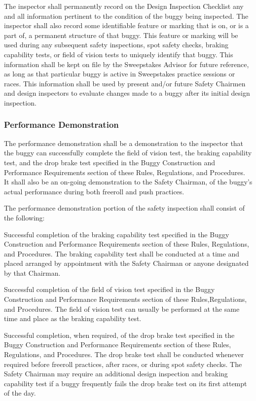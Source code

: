 \documentclass[openany]{book}
\begin{document}
The inspector shall permanently record on the Design Inspection Checklist any and all information pertinent to the condition of the buggy being inspected. The inspector shall also record some identifiable feature or marking that is on, or is a part of, a permanent structure of that buggy. This feature or marking will be used during any subsequent safety inspections, spot safety checks, braking capability tests, or field of vision tests to uniquely identify that buggy. This information shall be kept on file by the Sweepstakes Advisor for future reference, as long as that particular buggy is active in Sweepstakes practice sessions or races. This information shall be used by present and/or future Safety Chairmen and design inspectors to evaluate changes made to a buggy after its initial design inspection.

\subsubsection{Performance Demonstration}
The performance demonstration shall be a demonstration to the inspector that the buggy can successfully complete the field of vision test, the braking capability test, and the drop brake test specified in the Buggy Construction and Performance Requirements section of these Rules, Regulations, and Procedures. It shall also be an on-going demonstration to the Safety Chairman, of the buggy's actual performance during both freeroll and push practices.

The performance demonstration portion of the safety inspection shall consist of the following:

Successful completion of the braking capability test specified in the Buggy Construction and Performance Requirements section of these Rules, Regulations, and Procedures. The braking capability test shall be conducted at a time and placed arranged by appointment with the Safety Chairman or anyone designated by that Chairman.

Successful completion of the field of vision test specified in the Buggy Construction and Performance Requirements section of these Rules,Regulations, and Procedures. The field of vision test can usually be performed at the same time and place as the braking capability test.

Successful completion, when required, of the drop brake test specified in the Buggy Construction and Performance Requirements section of these Rules, Regulations, and Procedures. The drop brake test shall be conducted whenever required before freeroll practices, after races, or during spot safety checks. The Safety Chairman may require an additional design inspection and braking capability test if a buggy frequently fails the drop brake test on its first attempt of the day.
\end{document}
